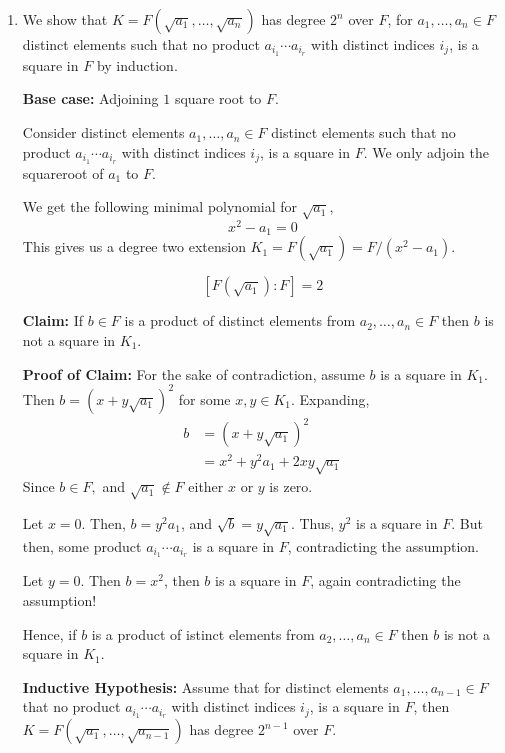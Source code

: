 \documentclass[12pt]{article}
\begin{document}
\begin{solution}
    \bbni
    \begin{enumerate}
        \item  We show that $K = F(\sqrt{a_1},\dotsc,\sqrt{a_n})$ has degree $2^n$ over $F$, for $a_1,\dotsc,a_n \in F$ distinct elements such that no product $a_{i_1}\dotsm a_{i_r}$ with distinct indices $i_j$, is a square in $F$ by induction. 
        
        \textbf{Base case:} Adjoining $1$ square root to $F$. 

        Consider distinct elements $a_1,\dotsc,a_n \in F$ distinct elements such that no product $a_{i_1}\dotsm a_{i_r}$ with distinct indices $i_j$, is a square in $F$. We only adjoin the squareroot of $a_1$ to $F$. 
        
        We get the following minimal polynomial for $\sqrt{a_1}$, 
        \[x^2 - a_1 = 0\]
        This gives us a degree two extension $K_1  = F(\sqrt{a_1}) =F/(x^2-a_1)$. 

        \[[F(\sqrt{a_1}):F] = 2\]

        \textbf{Claim:} If $b \in F$ is a product of distinct elements from $a_2, \ldots, a_n \in F$ then $b$ is not a square in $K_1$.
        
        \textbf{Proof of Claim:} For the sake of contradiction, assume $b$ is a square in $K_1$. Then $b = (x + y\sqrt{a_1})^2$ for some $x,y \in K_1$. Expanding, 
        \begin{align*}
            b &= (x + y\sqrt{a_1})^2 \\ 
            &= x^2 + y^2a_1 + 2xy\sqrt{a_1}
        \end{align*}
        Since $b \in F,$ and $\sqrt{a_1} \notin F$ either $x$ or $y$ is zero. 

        Let $x = 0$. Then, $b = y^2a_1$, and $\sqrt{b} = y\sqrt{a_1}$. Thus, $y^2$ is a square in $F$. But then, some product $a_{i_1}\cdots a_{i_r}$ is a square in $F$, contradicting the assumption. 
        
        Let $y = 0$. Then $b = x^2$, then $b$ is a square in $F$, again contradicting the assumption!

        Hence, if $b$ is a product of istinct elements from $a_2, \ldots, a_n \in F$ then $b$ is not a square in $K_1$.

        \textbf{Inductive Hypothesis:} Assume that for distinct elements $a_1,\dotsc,a_{n-1} \in F$ that no product $a_{i_1}\dotsm a_{i_r}$ with distinct indices $i_j$, is a square in $F$, then $K = F(\sqrt{a_1},\dotsc,\sqrt{a_{n-1}})$ has degree $2^{n-1}$ over $F$. 
        

\end{enumerate}
\end{solution}
\end{document}
